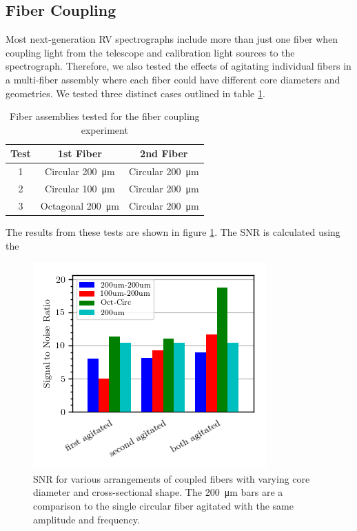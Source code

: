 \documentclass[twocolumn]{emulateapj}
\begin{document}
\subsection{Fiber Coupling}

Most next-generation RV spectrographs include more than just one fiber when coupling light from the telescope and calibration light sources to the spectrograph. Therefore, we also tested the effects of agitating individual fibers in a multi-fiber assembly where each fiber could have different core diameters and geometries. We tested three distinct cases outlined in table \ref{table:fiber_coupling}.

\begin{table}
\centering
\caption{Fiber assemblies tested for the fiber coupling experiment}
	\begin{tabular}{ccc}
	\hline
	Test & 1st Fiber & 2nd Fiber \\
	\hline \hline
	1 & Circular \SI{200}{\micro\meter} & Circular \SI{200}{\micro\meter} \\
	\hline
	2 & Circular \SI{100}{\micro\meter} & Circular \SI{200}{\micro\meter} \\
	\hline
	3 & Octagonal \SI{200}{\micro\meter} & Circular \SI{200}{\micro\meter} \\
	\hline
	\end{tabular}
\label{table:fiber_coupling}
\end{table}

The results from these tests are shown in figure \ref{fig:coupled_fibers}. The SNR is calculated using the 

\begin{figure}
\centering
	\includegraphics[width=\columnwidth]{images/coupled_fibers.png}
	\caption{SNR for various arrangements of coupled fibers with varying core diameter and cross-sectional shape. The \SI{200}{\micro\meter} bars are a comparison to the single circular fiber agitated with the same amplitude and frequency.}
\label{fig:coupled_fibers}
\end{figure}
\end{document}
